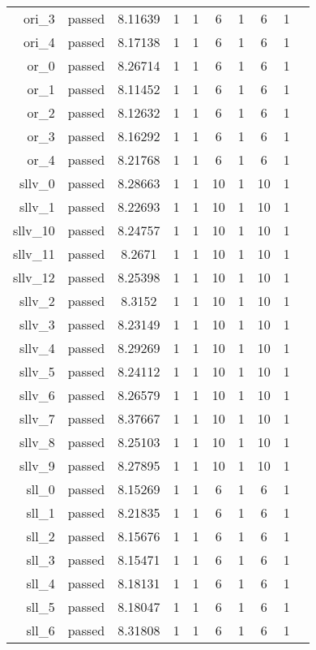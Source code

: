 \begin{longtable}{r|ccccccccc}
    ori\_3 & passed & 8.11639 & 1 & 1 & 6 & 1 & 6 & 1 \\
    ori\_4 & passed & 8.17138 & 1 & 1 & 6 & 1 & 6 & 1 \\
    or\_0 & passed & 8.26714 & 1 & 1 & 6 & 1 & 6 & 1 \\
    or\_1 & passed & 8.11452 & 1 & 1 & 6 & 1 & 6 & 1 \\
    or\_2 & passed & 8.12632 & 1 & 1 & 6 & 1 & 6 & 1 \\
    or\_3 & passed & 8.16292 & 1 & 1 & 6 & 1 & 6 & 1 \\
    or\_4 & passed & 8.21768 & 1 & 1 & 6 & 1 & 6 & 1 \\
    sllv\_0 & passed & 8.28663 & 1 & 1 & 10 & 1 & 10 & 1 \\
    sllv\_1 & passed & 8.22693 & 1 & 1 & 10 & 1 & 10 & 1 \\
    sllv\_10 & passed & 8.24757 & 1 & 1 & 10 & 1 & 10 & 1 \\
    sllv\_11 & passed & 8.2671 & 1 & 1 & 10 & 1 & 10 & 1 \\
    sllv\_12 & passed & 8.25398 & 1 & 1 & 10 & 1 & 10 & 1 \\
    sllv\_2 & passed & 8.3152 & 1 & 1 & 10 & 1 & 10 & 1 \\
    sllv\_3 & passed & 8.23149 & 1 & 1 & 10 & 1 & 10 & 1 \\
    sllv\_4 & passed & 8.29269 & 1 & 1 & 10 & 1 & 10 & 1 \\
    sllv\_5 & passed & 8.24112 & 1 & 1 & 10 & 1 & 10 & 1 \\
    sllv\_6 & passed & 8.26579 & 1 & 1 & 10 & 1 & 10 & 1 \\
    sllv\_7 & passed & 8.37667 & 1 & 1 & 10 & 1 & 10 & 1 \\
    sllv\_8 & passed & 8.25103 & 1 & 1 & 10 & 1 & 10 & 1 \\
    sllv\_9 & passed & 8.27895 & 1 & 1 & 10 & 1 & 10 & 1 \\
    sll\_0 & passed & 8.15269 & 1 & 1 & 6 & 1 & 6 & 1 \\
    sll\_1 & passed & 8.21835 & 1 & 1 & 6 & 1 & 6 & 1 \\
    sll\_2 & passed & 8.15676 & 1 & 1 & 6 & 1 & 6 & 1 \\
    sll\_3 & passed & 8.15471 & 1 & 1 & 6 & 1 & 6 & 1 \\
    sll\_4 & passed & 8.18131 & 1 & 1 & 6 & 1 & 6 & 1 \\
    sll\_5 & passed & 8.18047 & 1 & 1 & 6 & 1 & 6 & 1 \\
    sll\_6 & passed & 8.31808 & 1 & 1 & 6 & 1 & 6 & 1 \\

\end{longtable}
